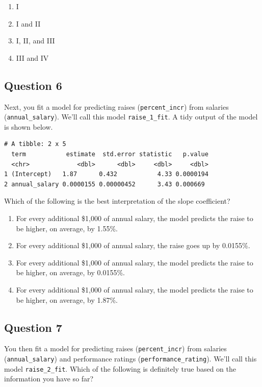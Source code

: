 \documentclass[
  letterpaper,
  DIV=11,
  numbers=noendperiod]{scrartcl}
\providecommand{\tightlist}{%
  \setlength{\itemsep}{0pt}\setlength{\parskip}{0pt}}\usepackage{longtable,booktabs,array}
\begin{document}
\begin{enumerate}
\def\labelenumi{\alph{enumi}.}
\tightlist
\item
  I
\item
  I and II
\item
  I, II, and III
\item
  III and IV
\end{enumerate}

\hypertarget{question-6}{%
\subsection{Question 6}\label{question-6}}

Next, you fit a model for predicting raises (\texttt{percent\_incr})
from salaries (\texttt{annual\_salary}). We'll call this model
\texttt{raise\_1\_fit}. A tidy output of the model is shown below.

\begin{verbatim}
# A tibble: 2 x 5
  term           estimate  std.error statistic   p.value
  <chr>             <dbl>      <dbl>     <dbl>     <dbl>
1 (Intercept)   1.87      0.432           4.33 0.0000194
2 annual_salary 0.0000155 0.00000452      3.43 0.000669 
\end{verbatim}

Which of the following is the best interpretation of the slope
coefficient?

\begin{enumerate}
\def\labelenumi{\alph{enumi}.}
\tightlist
\item
  For every additional \$1,000 of annual salary, the model predicts the
  raise to be higher, on average, by 1.55\%.
\item
  For every additional \$1,000 of annual salary, the raise goes up by
  0.0155\%.
\item
  For every additional \$1,000 of annual salary, the model predicts the
  raise to be higher, on average, by 0.0155\%.
\item
  For every additional \$1,000 of annual salary, the model predicts the
  raise to be higher, on average, by 1.87\%.
\end{enumerate}

\newpage{}

\hypertarget{question-7}{%
\subsection{Question 7}\label{question-7}}

You then fit a model for predicting raises (\texttt{percent\_incr}) from
salaries (\texttt{annual\_salary}) and performance ratings
(\texttt{performance\_rating}). We'll call this model
\texttt{raise\_2\_fit}. Which of the following is definitely true based
on the information you have so far?
\end{document}
